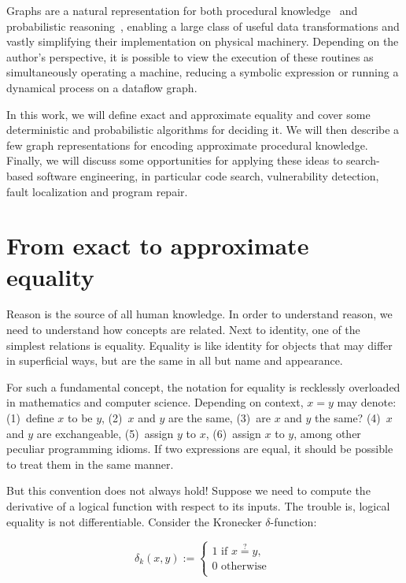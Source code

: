 \documentclass[11pt]{article}
\begin{document}
    Graphs are a natural representation for both procedural knowledge~\citep{allamanis2017learning} and probabilistic reasoning~\citep{pearl2014probabilistic}, enabling a large class of useful data transformations and vastly simplifying their implementation on physical machinery. Depending on the author's perspective, it is possible to view the execution of these routines as simultaneously operating a machine, reducing a symbolic expression or running a dynamical process on a dataflow graph.

    In this work, we will define exact and approximate equality and cover some deterministic and probabilistic algorithms for deciding it. We will then describe a few graph representations for encoding approximate procedural knowledge. Finally, we will discuss some opportunities for applying these ideas to search-based software engineering, in particular code search, vulnerability detection, fault localization and program repair.


    \section{From exact to approximate equality}\label{sec:definitions}

    Reason is the source of all human knowledge. In order to understand reason, we need to understand how concepts are related. Next to identity, one of the simplest relations is equality. Equality is like identity for objects that may differ in superficial ways, but are the same in all but name and appearance.

    For such a fundamental concept, the notation for equality is recklessly overloaded in mathematics and computer science. Depending on context, $x = y$ may denote: (1)~define $x$ to be $y$, (2)~$x$ and $y$ are the same, (3)~are $x$ and $y$ the same? (4)~$x$ and $y$ are exchangeable, (5)~assign $y$ to $x$, (6)~assign $x$ to $y$, among other peculiar programming idioms. If two expressions are equal, it should be possible to treat them in the same manner.

    But this convention does not always hold! Suppose we need to compute the derivative of a logical function with respect to its inputs. The trouble is, logical equality is not differentiable. Consider the Kronecker $δ$-function: %

    $$
    δ_k(x, y) :=
    \begin{cases}
        1 \text{ if } x \overset{?}{=} y, \\
        0 \text{ otherwise }\\
    \end{cases}
    $$
\end{document}
